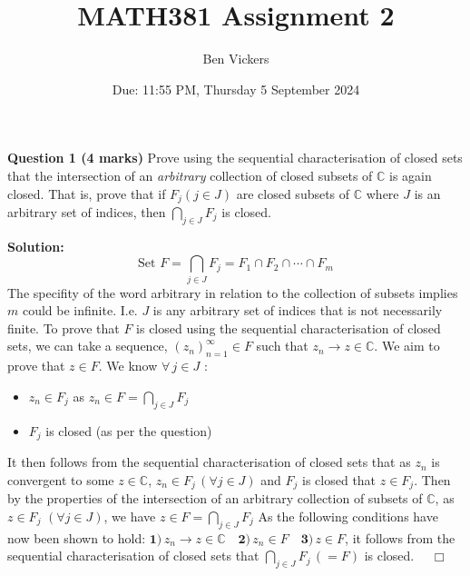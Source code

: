 \documentclass[12pt]{article}
\title{MATH381 Assignment 2}
\author{Ben Vickers}
\date{Due: 11:55 PM, Thursday 5 September 2024}
\begin{document}
\maketitle

\noindent \textbf{Question 1 (4 marks)} Prove using the sequential characterisation of closed sets that the intersection of an \textit{arbitrary} collection of closed subsets of \( \mathbb{C}\) is again closed. That is, prove that if \(F_j \left(j \in J\right)\) are closed subsets of \(\mathbb{C}\) where \(J\) is an arbitrary set of indices, then \(\bigcap_{j \in J} F_j\) is closed.\newline

\noindent \textbf{Solution:}
\[
\text{Set }F = \bigcap_{j \in J} F_j = F_1 \cap F_2 \cap \cdots \cap F_m
\]
\noindent The specifity of the word arbitrary in relation to the collection of subsets implies $m$ could be infinite. I.e. $J$ is any arbitrary set of indices that is not necessarily finite. \newline
\linebreak
To prove that $F$ is closed using the sequential characterisation of closed sets, we can take a sequence, \( \left(z_n\right)_{n=1}^{\infty} \in F\) such that \(z_n \to z \in \mathbb{C}\). We aim to prove that \(z \in F\). \newline
\linebreak
We know \(\forall \, j \in J\)  :
\begin{itemize}
    \item \(z_n \in F_j \) as \(z_n \in F = \bigcap_{j \in J} F_j \)
    \item \(F_j \) is closed (as per the question)
\end{itemize}
It then follows from the sequential characterisation of closed sets that as \(z_n \) is convergent to some \(z \in \mathbb{C}\), \(z_n \in F_j \,\left(\forall j \in J\right)\) and \(F_j\) is closed that \(z \in F_j\). \newline
\linebreak
Then by the properties of the intersection of an arbitrary collection of subsets of \(\mathbb{C}\), as \(z \in F_j \,\, \left(\forall j \in J\right)\), we have \(z \in F =  \bigcap_{j \in J} F_j\)\newline
\linebreak
As the following conditions have now been shown to hold: \( \textbf{1)} \, z_n \to z \in \mathbb{C}\quad \textbf{2)}\, z_n \in F \quad \textbf{3)}\, z \in F  \), it follows from the sequential characterisation of closed sets that \(\bigcap_{j \in J} F_j \, \left(= F\right)\) is closed. \(\quad \Box\)\newline
\end{document}
